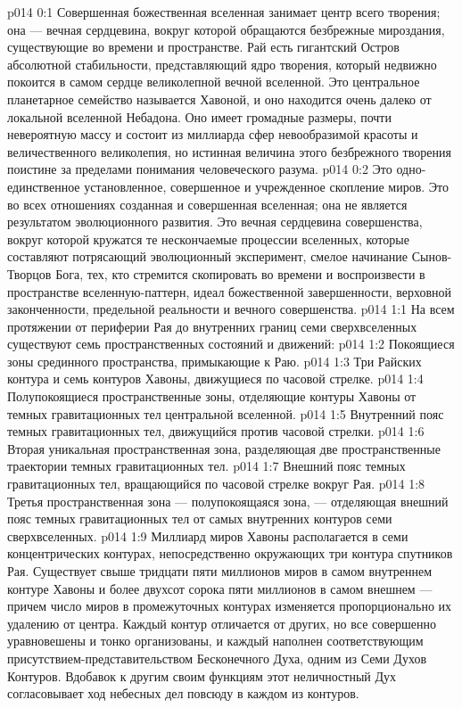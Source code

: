 \author{Совершенствователь Мудрости}
\vs p014 0:1 Совершенная божественная вселенная занимает центр всего творения; она --- вечная сердцевина, вокруг которой обращаются безбрежные мироздания, существующие во времени и пространстве. Рай есть гигантский Остров абсолютной стабильности, представляющий ядро творения, который недвижно покоится в самом сердце великолепной вечной вселенной. Это центральное планетарное семейство называется Хавоной, и оно находится очень далеко от локальной вселенной Небадона. Оно имеет громадные размеры, почти невероятную массу и состоит из миллиарда сфер невообразимой красоты и величественного великолепия, но истинная величина этого безбрежного творения поистине за пределами понимания человеческого разума.
\vs p014 0:2 Это одно\hyp{}единственное установленное, совершенное и учрежденное скопление миров. Это во всех отношениях созданная и совершенная вселенная; она не является результатом эволюционного развития. Это вечная сердцевина совершенства, вокруг которой кружатся те нескончаемые процессии вселенных, которые составляют потрясающий эволюционный эксперимент, смелое начинание Сынов\hyp{}Творцов Бога, тех, кто стремится скопировать во времени и воспроизвести в пространстве вселенную\hyp{}паттерн, идеал божественной завершенности, верховной законченности, предельной реальности и вечного совершенства.
\vs p014 1:1 На всем протяжении от периферии Рая до внутренних границ семи сверхвселенных существуют семь пространственных состояний и движений:
\vs p014 1:2 \bibnobreakspace Покоящиеся зоны срединного пространства, примыкающие к Раю.
\vs p014 1:3 \bibnobreakspace Три Райских контура и семь контуров Хавоны, движущиеся по часовой стрелке.
\vs p014 1:4 \bibnobreakspace Полупокоящиеся пространственные зоны, отделяющие контуры Хавоны от темных гравитационных тел центральной вселенной.
\vs p014 1:5 \bibnobreakspace Внутренний пояс темных гравитационных тел, движущийся против часовой стрелки.
\vs p014 1:6 \bibnobreakspace Вторая уникальная пространственная зона, разделяющая две пространственные траектории темных гравитационных тел.
\vs p014 1:7 \bibnobreakspace Внешний пояс темных гравитационных тел, вращающийся по часовой стрелке вокруг Рая.
\vs p014 1:8 \bibnobreakspace Третья пространственная зона --- полупокоящаяся зона, --- отделяющая внешний пояс темных гравитационных тел от самых внутренних контуров семи сверхвселенных.
\vs p014 1:9 \pc Миллиард миров Хавоны располагается в семи концентрических контурах, непосредственно окружающих три контура спутников Рая. Существует свыше тридцати пяти миллионов миров в самом внутреннем контуре Хавоны и более двухсот сорока пяти миллионов в самом внешнем --- причем число миров в промежуточных контурах изменяется пропорционально их удалению от центра. Каждый контур отличается от других, но все совершенно уравновешены и тонко организованы, и каждый наполнен соответствующим присутствием\hyp{}представительством Бесконечного Духа, одним из Семи Духов Контуров. Вдобавок к другим своим функциям этот неличностный Дух согласовывает ход небесных дел повсюду в каждом из контуров.
